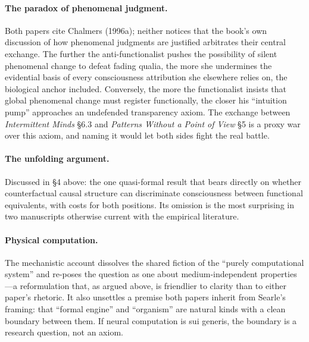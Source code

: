 \documentclass[11pt]{article}
\newcommand{\IM}{\emph{Intermittent Minds}}
\newcommand{\PP}{\emph{Patterns Without a Point of View}}
\begin{document}
\paragraph{The paradox of phenomenal judgment.} Both papers cite Chalmers (1996a); neither notices that the book's own discussion of how phenomenal judgments are justified arbitrates their central exchange. The further the anti-functionalist pushes the possibility of silent phenomenal change to defeat fading qualia, the more she undermines the evidential basis of every consciousness attribution she elsewhere relies on, the biological anchor included. Conversely, the more the functionalist insists that global phenomenal change must register functionally, the closer his ``intuition pump'' approaches an undefended transparency axiom. The exchange between \IM{} \S 6.3 and \PP{} \S 5 is a proxy war over this axiom, and naming it would let both sides fight the real battle.

\paragraph{The unfolding argument.} Discussed in \S 4 above: the one quasi-formal result that bears directly on whether counterfactual causal structure can discriminate consciousness between functional equivalents, with costs for both positions. Its omission is the most surprising in two manuscripts otherwise current with the empirical literature.

\paragraph{Physical computation.} The mechanistic account dissolves the shared fiction of the ``purely computational system'' and re-poses the question as one about medium-independent properties---a reformulation that, as argued above, is friendlier to clarity than to either paper's rhetoric. It also unsettles a premise both papers inherit from Searle's framing: that ``formal engine'' and ``organism'' are natural kinds with a clean boundary between them. If neural computation is sui generis, the boundary is a research question, not an axiom.
\end{document}
